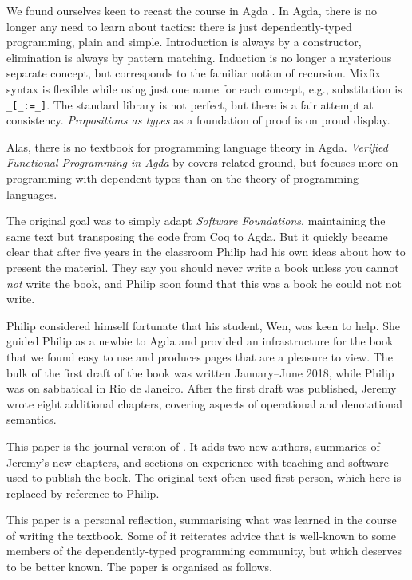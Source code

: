 \documentclass[preprint,authoryear]{elsarticle}
\begin{document}
We found ourselves keen to recast the course in Agda \citep{Bove-et-al-2009}.
In Agda, there is
no longer any need to learn about tactics: there is just
dependently-typed programming, plain and simple. Introduction is
always by a constructor, elimination is always by pattern
matching. Induction is no longer a mysterious separate concept, but
corresponds to the familiar notion of recursion. Mixfix syntax is
flexible while using just one name for each concept, e.g.,
substitution is \texttt{\_[\_:=\_]}. The standard library is not perfect, but
there is a fair attempt at consistency. \emph{Propositions as types} as a
foundation of proof is on proud display.

Alas, there is no textbook for programming language theory in
Agda.  \emph{Verified Functional Programming in Agda} by \citep{Stump-2016}
covers related ground, but focuses more on programming with dependent
types than on the theory of programming languages.

The original goal was to simply adapt \emph{Software Foundations},
maintaining the same text but transposing the code from Coq to Agda.
But it quickly became clear that after five years in the
classroom Philip had his own ideas about how to present the material.  They
say you should never write a book unless you cannot \emph{not} write the
book, and Philip soon found that this was a book he could not not
write.

Philip considered himself fortunate that his student, Wen, was
keen to help.  She guided Philip as a newbie to Agda and provided an
infrastructure for the book that we found easy to use and produces
pages that are a pleasure to view.  The bulk of the first draft of the
book was written January--June 2018, while Philip was on sabbatical in
Rio de Janeiro.  After the first draft was published, Jeremy wrote
eight additional chapters, covering aspects of operational and
denotational semantics.

This paper is the journal version of \citet{Wadler-2018}.
It adds two new authors, summaries of Jeremy's new chapters,
and sections on experience with teaching and software
used to publish the book.  The original text often used
first person, which here is replaced by reference to Philip.

This paper is a personal reflection, summarising what was learned in the
course of writing the textbook. Some of it reiterates advice that is
well-known to some members of the dependently-typed programming
community, but which deserves to be better known.  The paper is
organised as follows.
\end{document}
